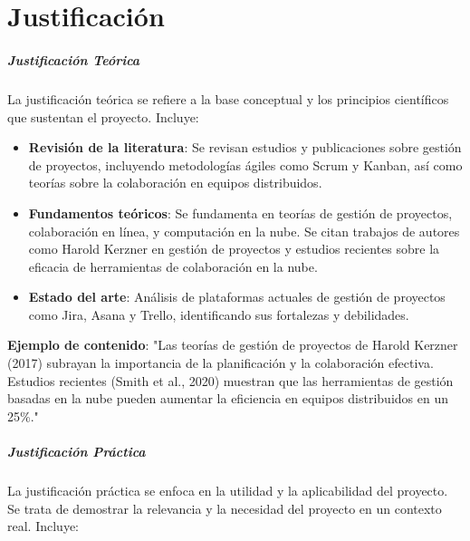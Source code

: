\chapter{Justificación}
\label{Justificación}


\paragraph{Justificación Teórica}
La justificación teórica se refiere a la base conceptual y los principios científicos que sustentan el proyecto. Incluye: 

\begin{itemize}
    \item \textbf{Revisión de la literatura}: Se revisan estudios y publicaciones sobre gestión de proyectos, incluyendo metodologías ágiles como Scrum y Kanban, así como teorías sobre la colaboración en equipos distribuidos.
    \item \textbf{Fundamentos teóricos}: Se fundamenta en teorías de gestión de proyectos, colaboración en línea, y computación en la nube. Se citan trabajos de autores como Harold Kerzner en gestión de proyectos y estudios recientes sobre la eficacia de herramientas de colaboración en la nube.
    \item \textbf{Estado del arte}: Análisis de plataformas actuales de gestión de proyectos como Jira, Asana y Trello, identificando sus fortalezas y debilidades.
\end{itemize}
\textbf{Ejemplo de contenido}: "Las teorías de gestión de proyectos de Harold Kerzner (2017) subrayan la importancia de la planificación y la colaboración efectiva. Estudios recientes (Smith et al., 2020) muestran que las herramientas de gestión basadas en la nube pueden aumentar la eficiencia en equipos distribuidos en un 25\%."

\paragraph{Justificación Práctica}
La justificación práctica se enfoca en la utilidad y la aplicabilidad del proyecto. Se trata de demostrar la relevancia y la necesidad del proyecto en un contexto real. Incluye: 

